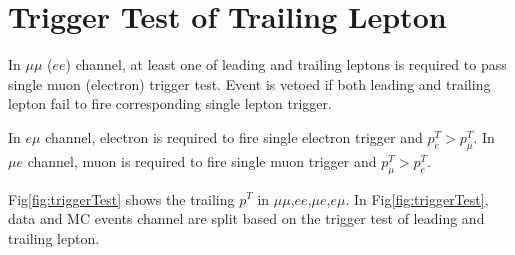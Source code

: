 \section{Trigger Test of Trailing Lepton}

In $\mu\mu$ ($ee$) channel, at least one of leading and trailing leptons is 
required to pass single muon (electron) trigger test. Event is vetoed if 
both leading and trailing lepton fail to fire corresponding single lepton trigger.

In $e\mu$ channel, electron is required to fire single electron trigger and $p^T_e>p^T_\mu$.
In $\mu e$ channel, muon is required to fire single muon trigger and $p^T_\mu>p^T_e$.

Fig\ref{fig:triggerTest} shows the trailing $p^T$ in $\mu\mu$,$ee$,$\mu e$,$e\mu$.
In Fig\ref{fig:triggerTest}, data and MC events channel are split based on the trigger test of 
leading and trailing lepton.


